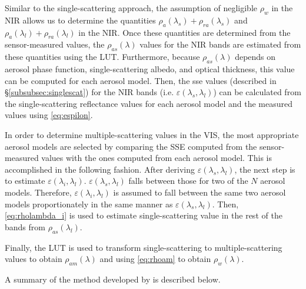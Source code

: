 Similar to the single-scattering approach, the assumption of negligible $\rho_w$ in the NIR allows us to determine the quantities $\rho_a(\lambda_s)+\rho_{ra}(\lambda_s)$ and $\rho_a(\lambda_l)+\rho_{ra}(\lambda_l)$ in the NIR. Once these quantities are determined from the sensor-measured values, the $\rho_{as}(\lambda)$ values for the NIR bands are estimated from these quantities using the LUT. Furthermore, because $\rho_{as}(\lambda)$ depends on aerosol phase function, single-scattering albedo, and optical thickness, this value can be computed for each aerosol model. Then, the \gls{sse}  values (described in \S\ref{subsubsec:singlescat}) for the NIR bands (i.e. $\varepsilon(\lambda_s,\lambda_l)$) can be calculated from the single-scattering reflectance values for each aerosol model and the measured values using \autoref{eq:espilon}. 

In order to determine multiple-scattering values in the VIS, the most appropriate aerosol models are selected by comparing the SSE computed from the sensor-measured values with the ones computed from each aerosol model. This is accomplished in the following fashion. After deriving $\varepsilon(\lambda_s,\lambda_l)$, the next step is to estimate $\varepsilon(\lambda_i,\lambda_l)$. $\varepsilon(\lambda_s,\lambda_l)$ falls between those for two of the $N$ aerosol models. Therefore, $\varepsilon(\lambda_i,\lambda_l)$ is assumed to fall between the same two aerosol models proportionately in the same manner as $\varepsilon(\lambda_s,\lambda_l)$. Then, \autoref{eq:rholambda_i} is used to estimate single-scattering value in the rest of the bands from $\rho_{as}(\lambda_l)$. 

Finally, the LUT is used to transform single-scattering to multiple-scattering values to obtain $\rho_{am}(\lambda)$ and using \autoref{eq:rhoam} to obtain $\rho_w(\lambda)$. 

A summary of the method developed by \citet{Gordon:1994} is described below.

